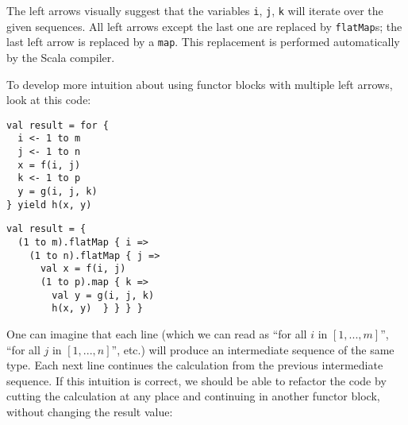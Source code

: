 \vspace{0.2\baselineskip}
The left arrows visually suggest that the variables \lstinline!i!,
\lstinline!j!, \lstinline!k! will iterate over the given sequences.
All left arrows except the last one are replaced by \lstinline!flatMap!s;
the last left arrow is replaced by a \lstinline!map!. This replacement
is performed automatically by the Scala compiler.

To develop more intuition about using functor blocks with multiple
left arrows, look at this code:

\noindent \texttt{\textcolor{blue}{\footnotesize{}}}%
\begin{minipage}[c]{0.475\columnwidth}%
\texttt{\textcolor{blue}{\footnotesize{}}}
\begin{lstlisting}
val result = for {
  i <- 1 to m
  j <- 1 to n
  x = f(i, j)
  k <- 1 to p
  y = g(i, j, k)
} yield h(x, y)
\end{lstlisting}
%
\end{minipage}\texttt{\textcolor{blue}{\footnotesize{}\hspace*{\fill}}}%
\begin{minipage}[c]{0.475\columnwidth}%
\texttt{\textcolor{blue}{\footnotesize{}}}
\begin{lstlisting}
val result = {
  (1 to m).flatMap { i =>
    (1 to n).flatMap { j =>
      val x = f(i, j)
      (1 to p).map { k =>
        val y = g(i, j, k)
        h(x, y)  } } } }
\end{lstlisting}
%
\end{minipage}{\footnotesize\par}

\vspace{0.2\baselineskip}
One can imagine that each line (which we can read as \textsf{``}for all $i$
in $\left[1,...,m\right]$\textsf{''}, \textsf{``}for all $j$ in $\left[1,...,n\right]$\textsf{''},
etc.) will produce an intermediate sequence of the same type. Each
next line continues the calculation from the previous intermediate
sequence. If this intuition is correct, we should be able to refactor
the code by cutting the calculation at any place and continuing in
another functor block, without changing the result value:

